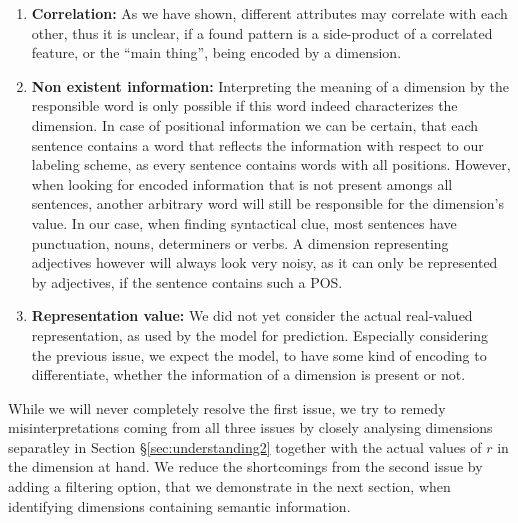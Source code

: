 \begin{enumerate}
\item \textbf{Correlation:} As we have shown, different attributes may correlate with each other, thus it is unclear, if a found pattern is a side-product of a correlated feature, or the ``main thing'', being encoded by a dimension.  
\item \textbf{Non existent information:} Interpreting the meaning of a dimension by the responsible word is only possible if this word indeed characterizes the dimension. In case of positional information we can be certain, that each sentence contains a word that reflects the information with respect to our labeling scheme, as every sentence contains words with all positions. However, when looking for encoded information that is not present amongs all sentences, another arbitrary word will still be responsible for the dimension's value. In our case, when finding syntactical clue, most sentences have punctuation, nouns, determiners or verbs. A dimension representing adjectives however will always look very noisy, as it can only be represented by adjectives, if the sentence contains such a \ac{POS}.
\item \textbf{Representation value:} We did not yet consider the actual real-valued representation, as used by the model for prediction. Especially considering the previous issue, we expect the model, to have some kind of encoding to differentiate, whether the information of a dimension is present or not.
\end{enumerate} 
While we will never completely resolve the first issue, we try to remedy misinterpretations coming from all three issues by closely analysing dimensions separatley in Section §\ref{sec:understanding2} together with the actual values of $r$ in the dimension at hand. We reduce the shortcomings from the second issue by adding a filtering option, that we demonstrate in the next section, when identifying dimensions containing semantic information.


